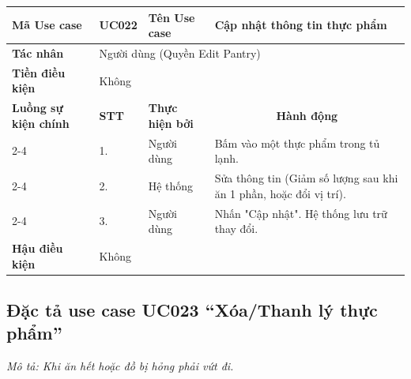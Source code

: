 \documentclass[../main.tex]{subfiles}
\begin{document}
\begin{longtable}{|p{2.7cm}|p{0.8cm}|p{2.6cm}|p{7.3cm}|}
\hline
\cellcolor[HTML]{D5F5E3}\textbf{Mã Use case} & \multicolumn{1}{l|}{UC022} & \cellcolor[HTML]{D5F5E3}\textbf{Tên Use case} & Cập nhật thông tin thực phẩm \\ \hline
\cellcolor[HTML]{D5F5E3}\textbf{Tác nhân} & \multicolumn{3}{p{10.7cm}|}{Người dùng (Quyền Edit Pantry)} \\ \hline
\cellcolor[HTML]{D5F5E3}\textbf{Tiền điều kiện} & \multicolumn{3}{p{10.7cm}|}{Không} \\ \hline

\cellcolor[HTML]{D5F5E3}\textbf{Luồng sự kiện chính} & \cellcolor[HTML]{FDEBD0}\textbf{STT} & \cellcolor[HTML]{FDEBD0}\textbf{Thực hiện bởi} & \multicolumn{1}{c|}{\cellcolor[HTML]{FDEBD0}\textbf{Hành động}} \\ \cline{2-4} 
\cellcolor[HTML]{D5F5E3} & 1. & Người dùng & Bấm vào một thực phẩm trong tủ lạnh. \\ \cline{2-4} 
\cellcolor[HTML]{D5F5E3} & 2. & Hệ thống & Sửa thông tin (Giảm số lượng sau khi ăn 1 phần, hoặc đổi vị trí). \\ \cline{2-4} 
\cellcolor[HTML]{D5F5E3} & 3. & Người dùng & Nhấn "Cập nhật". Hệ thống lưu trữ thay đổi. \\ \hline

\cellcolor[HTML]{D5F5E3}\textbf{Hậu điều kiện} & \multicolumn{3}{p{10.7cm}|}{Không} \\ \hline
\end{longtable}
\endgroup

\subsection{Đặc tả use case UC023 ``Xóa/Thanh lý thực phẩm''}
\textit{Mô tả: Khi ăn hết hoặc đồ bị hỏng phải vứt đi.}
\vspace{0.5cm}

\begingroup
\renewcommand{\arraystretch}{1.5}
\end{document}
